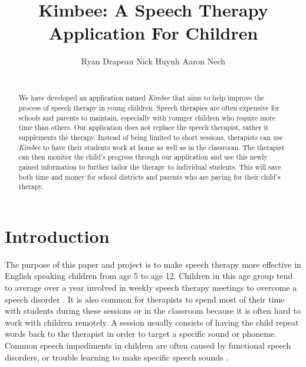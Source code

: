 \documentclass{sig-alternate-2013}
\begin{document}
\title{Kimbee: A Speech Therapy Application For Children}

\author{
    \alignauthor
    \vspace*{-0.3in}
        Ryan Drapeau \hspace{3.0cm}
        Nick Huynh \hspace{3.0cm}
        Aaron Nech \\
     \\[3 pt]
}

\maketitle

\begin{abstract}

We have developed an application named {\em Kimbee} that aims to help improve the process of speech therapy in young children. Speech therapies are often expensive for schools and parents to maintain, especially with younger children who require more time than others. Our application does not replace the speech therapist, rather it supplements the therapy. Instead of being limited to short sessions, therapists can use {\em Kimbee} to have their students work at home as well as in the classroom. The therapist can then monitor the child's progress through our application and use this newly gained information to further tailor the therapy to individual students. This will save both time and money for school districts and parents who are paying for their child's therapy.

\end{abstract}

\section{Introduction}

The purpose of this paper and project is to make speech therapy more effective in English speaking children from age 5 to age 12. Children in this age group tend to average over a year involved in weekly speech therapy meetings to overcome a speech disorder \cite{Kreider:Intro}. It is also common for therapists to spend most of their time with students during these sessions or in the classroom because it is often hard to work with children remotely. A session usually consists of having the child repeat words back to the therapist in order to target a specific sound or phoneme. Common speech impediments in children are often caused by functional speech disorders, or trouble learning to make specific speech sounds \cite{Brown:Children}.
\end{document}
